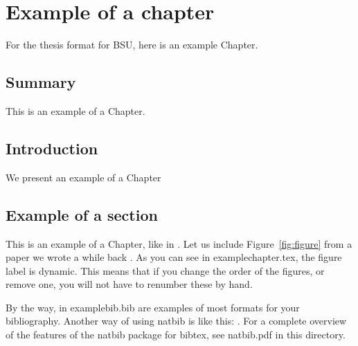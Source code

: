 \chapter{Example of a chapter}
\label{chap:example}

For the thesis format for BSU, here is an example Chapter.

\section{Summary}
 This is an example of a Chapter. 
\section{Introduction}
We present an example of a Chapter

\section{\nobreak Example of a section}
This is an example of a Chapter, like in \citet{mythesis}. Let us
include Figure~\ref{fig:figure} from a paper we wrote a while back
\citep{scalesvanwijk01}. As you can see in examplechapter.tex, the
figure label is dynamic. This means that if you change the order of
the figures, or remove one, you will not have to renumber these by
hand.

By the way, in examplebib.bib are examples of most formats for your
bibliography. Another way of using natbib is like this: \cite[or][for
example]{mythesis}. For a complete overview of the features of the
natbib package for bibtex, see natbib.pdf in this directory.

